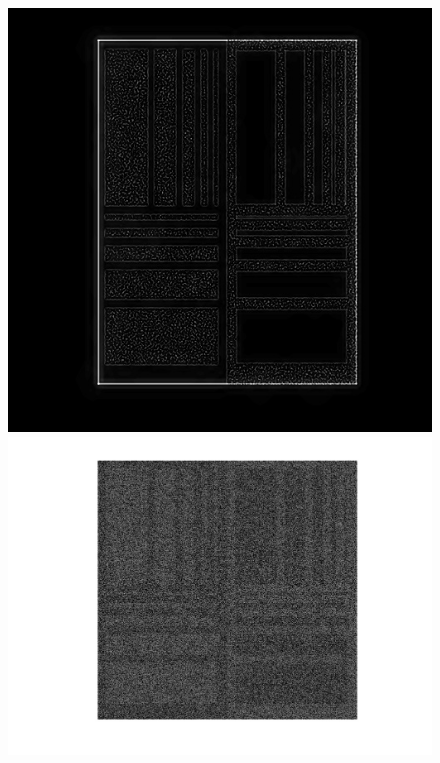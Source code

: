 \documentclass[a4paper]{article} %
\begin{document}
\begin{figure}[!htb]
  \includegraphics[width=\linewidth]{mult_Eq_Phantom_0p000_4_1_1.jpg}
\endminipage\hfill
  \includegraphics[width=\linewidth]{Eq_Phantom_0p500_4_1_1.jpg}
\endminipage\hfill
{}%

\end{figure}
\end{document}
